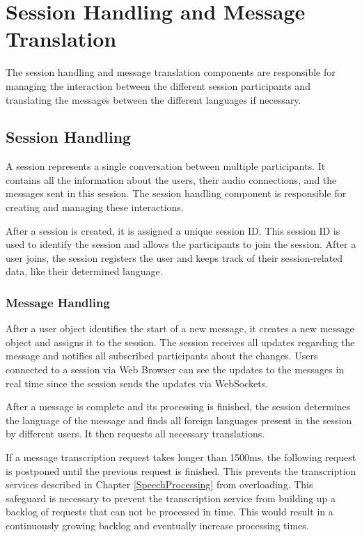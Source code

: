 \chapter{Session Handling and Message Translation}

\label{SessionHandlingAndMessageTranslation}

The session handling and message translation components are responsible for managing the interaction between the 
different session participants and translating the messages between the different languages if necessary.


\section{Session Handling}

A session represents a single conversation between multiple participants. It contains all the information about the 
users, their audio connections, and the messages sent in this session. The session handling component is 
responsible for creating and managing these interactions.

After a session is created, it is assigned a unique session ID. This session ID is used to identify the session and 
allows the participants to join the session. After a user joins, the session registers the user and keeps track of 
their session-related data, like their determined language.

\subsection{Message Handling}

After a user object identifies the start of a new message, it creates a new message object and assigns it to the 
session. The session receives all updates regarding the message and notifies all subscribed participants about the 
changes. Users connected to a session via Web Browser can see the updates to the messages in real time since the 
session sends the updates via WebSockets.

After a message is complete and its processing is finished, the session determines the language of the message and 
finds all foreign languages present in the session by different users. It then requests all necessary translations. 

If a message transcription request takes longer than 1500ms, the following request is postponed until the previous 
request is finished. This prevents the transcription services described in Chapter \ref{SpeechProcessing} from 
overloading. This safeguard is necessary to prevent the transcription service from building up a backlog of requests 
that can not be processed in time. This would result in a continuously growing backlog and eventually increase 
processing times.

